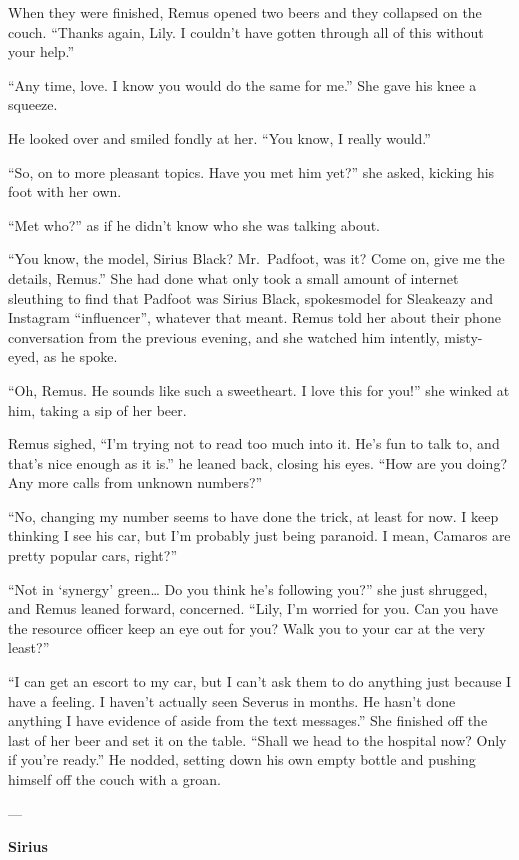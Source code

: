 \documentclass[12pt,twoside,openright]{memoir}
\begin{document}
When they were finished, Remus opened two beers and they collapsed on the couch. ``Thanks again, Lily. I couldn't have gotten through all of this without your help.'' 

``Any time, love. I know you would do the same for me.'' She gave his knee a squeeze.

He looked over and smiled fondly at her. ``You know, I really would.''

``So, on to more pleasant topics. Have you met him yet?'' she asked, kicking his foot with her own.

``Met who?'' as if he didn't know who she was talking about.

``You know, the model, Sirius Black? Mr.\ Padfoot, was it? Come on, give me the details, Remus.'' She had done what only took a small amount of internet sleuthing to find that Padfoot was Sirius Black, spokesmodel for Sleakeazy and Instagram ``influencer'', whatever that meant. Remus told her about their phone conversation from the previous evening, and she watched him intently, misty-eyed, as he spoke.

``Oh, Remus. He sounds like such a sweetheart. I love this for you!'' she winked at him, taking a sip of her beer.

Remus sighed, ``I'm trying not to read too much into it. He's fun to talk to, and that's nice enough as it is.'' he leaned back, closing his eyes. ``How are you doing? Any more calls from unknown numbers?''

``No, changing my number seems to have done the trick, at least for now. I keep thinking I see his car, but I'm probably just being paranoid. I mean, Camaros are pretty popular cars, right?''

``Not in ‘synergy' green… Do you think he's following you?'' she just shrugged, and Remus leaned forward, concerned.
``Lily, I'm worried for you. Can you have the resource officer keep an eye out for you? Walk you to your car at the very least?''

``I can get an escort to my car, but I can't ask them to do anything just because I have a feeling. I haven't actually seen Severus in months. He hasn't done anything I have evidence of aside from the text messages.'' She finished off the last of her beer and set it on the table. ``Shall we head to the hospital now? Only if you're ready.'' He nodded, setting down his own empty bottle and pushing himself off the couch with a groan.

---

\textbf{Sirius} 
\end{document}
